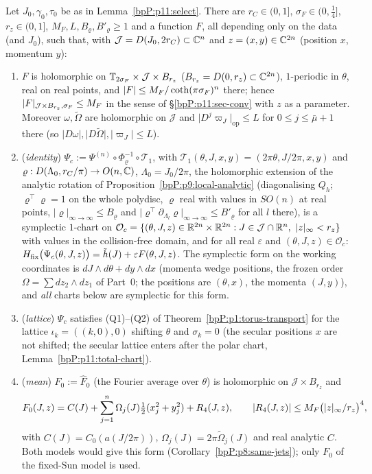 \begin{proposition}\label{bpP:p11:holo-chart}
Let $J_0,\gamma_0,\tau_0$ be as in Lemma~\ref{bpP:p11:select}. There are $r_C\in(0,1]$, $\sigma_F\in(0,\frac1{4}]$, $r_z\in(0,1]$, $M_F,L,B_\varrho,B'_\varrho\ge1$ and a function $F$, all depending only on the data (and $J_0$), such that, with $\mathcal J=D(J_0,2r_C)\subset\mathbb{C}^n$ and $z=(x,y)\in\mathbb{C}^{2n}$ (position $x$, momentum $y$):
\begin{enumerate}[label=(\alph*)]
\item $F$ is holomorphic on $\mathbb{T}_{2\sigma_F}\times\mathcal J\times B_{r_z}$ ($B_{r_z}=D(0,r_z)\subset\mathbb{C}^{2n}$), $1$-periodic in $\theta$, real on real points, and $\lvert F\rvert\le M_F/\coth(\pi\sigma_F)^n$ there; hence $\lvert F\rvert_{\mathcal J\times B_{r_z},\sigma_F}\le M_F$ in the sense of \S\ref{bpP:p11:sec-conv} with $z$ as a parameter. Moreover $\omega,\tilde\Omega$ are holomorphic on $\mathcal J$ and $\lvert D^j\varpi_J\rvert_{\mathrm{op}}\le L$ for $0\le j\le\bar\mu+1$ there (so $\lvert D\omega\rvert,\lvert D\tilde\Omega\rvert,\lvert\varpi_J\rvert\le L$).
\item (\emph{identity}) $\Psi_c:=\Psi^{(n)}\circ\Phi_\varrho^{-1}\circ\mathcal T_1$, with $\mathcal T_1(\theta,J,x,y)=(2\pi\theta,J/2\pi,x,y)$ and $\varrho:D(\Lambda_0,r_C/\pi)\to O(n,\mathbb{C})$, $\Lambda_0=J_0/2\pi$, the holomorphic extension of the analytic rotation of Proposition~\ref{bpP:p9:local-analytic} (diagonalising $Q_h$; $\varrho^\top\varrho=1$ on the whole polydisc, $\varrho$ real with values in $SO(n)$ at real points, $\lvert\varrho\rvert_{\infty\to\infty}\le B_\varrho$ and $\lvert\varrho^\top\partial_{\Lambda_l}\varrho\rvert_{\infty\to\infty}\le B'_\varrho$ for all $l$ there), is a symplectic $1$-chart on $\mathcal O_c=\{(\theta,J,z)\in\mathbb{R}^{2n}\times\mathbb{R}^{2n}:J\in\mathcal J\cap\mathbb{R}^n,\ \lvert z\rvert_\infty<r_z\}$ with values in the collision-free domain, and for all real $\varepsilon$ and $(\theta,J,z)\in\mathcal O_c$: $H_{\rm fix}\bigl(\Psi_c(\theta,J,z)\bigr)=\tilde h(J)+\varepsilon F(\theta,J,z)$. The symplectic form on the working coordinates is $dJ\wedge d\theta+dy\wedge dx$ (momenta wedge positions, the frozen order $\Omega=\sum dz_2\wedge dz_1$ of Part~0; the positions are $(\theta,x)$, the momenta $(J,y)$), and \emph{all} charts below are symplectic for this form.
\item (\emph{lattice}) $\Psi_c$ satisfies (Q1)--(Q2) of Theorem~\ref{bpP:p1:torus-transport} for the lattice $\iota_k=((k,0),0)$ shifting $\theta$ and $\sigma_k=0$ (the secular positions $x$ are not shifted; the secular lattice enters after the polar chart, Lemma~\ref{bpP:p11:total-chart}).
\item (\emph{mean}) $F_0:=\hat F_0$ (the Fourier average over $\theta$) is holomorphic on $\mathcal J\times B_{r_z}$ and
\[F_0(J,z)=C(J)+\sum_{j=1}^n\Omega_j(J)\tfrac12(x_j^2+y_j^2)+R_4(J,z),\qquad\lvert R_4(J,z)\rvert\le M_F\bigl(\lvert z\rvert_\infty/r_z\bigr)^4,\]
with $C(J)=C_0(a(J/2\pi))$, $\Omega_j(J)=2\pi\tilde\Omega_j(J)$ and real analytic $C$. Both models would give this form (Corollary~\ref{bpP:p8:same-jets}); only $F_0$ of the fixed-Sun model is used.
\end{enumerate}
\end{proposition}
